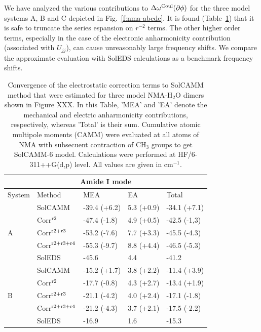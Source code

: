 \documentclass[a4paper,titlepage,twoside,fleqn,12pt]{book}
\begin{document}
\begin{appendices}
We have analyzed the various contributions to $\Delta\omega^{\rm Coul}(\partial\phi)$
for the three model systems A, B and C depicted in Fig.~\ref{f:nma-abcde}. It is found 
(Table~\ref{t:ctest}) that
it is safe to truncate the series espansion on $r^{-2}$ terms. The other higher order terms,
especially in the case of the electronic anharmonicity contribution 
(associated with $U_{jj}$), can cause unreasonably
large frequency shifts. 
We compare the approximate evaluation with SolEDS calculations as a benchmark frequency shifts.

\begin{table}[ht]
\caption{Convergence of the electrostatic correction terms to SolCAMM
method that were estimated for three model NMA-H$_2$O dimers
shown in Figure XXX. In this Table, 'MEA' and 'EA' denote the mechanical and electric
anharmonicity contributions, respectively, whereas 'Total' is their sum.
Cumulative atomic multipole moments (CAMM) were evaluated 
at all atoms of NMA with subsecuent contraction of CH$_3$ groups 
to get SolCAMM-6 model.
Calculations were performed at HF/6-311++G(d,p) level.
All values are given in cm$^{-1}$.
\label{t:ctest}}
\begin{tabular*}{1.0\textwidth}{@{\extracolsep{\fill} } l ll ll}
\hline\hline
\multicolumn{5}{c}{Amide I mode} \\
\hline
System               & Method    & MEA           & EA         & Total        \\
\hline
\multirow{5}{*}{A}   & SolCAMM   & -39.4 (+6.2)  & 5.3 (+0.9) & -34.1 (+7.1) \\
        & Corr$^{\rm r2}$        & -47.4 (-1.8)  & 4.9 (+0.5) & -42.5 (-1,3) \\
        & Corr$^{\rm r2+r3}$     & -53.2 (-7.6)  & 7.7 (+3.3) & -45.5 (-4.3) \\
        & Corr$^{\rm r2+r3+r4}$  & -55.3 (-9.7)  & 8.8 (+4.4) & -46.5 (-5.3) \\
                     & SolEDS    & -45.6         & 4.4        & -41.2        \\
\hline
\multirow{5}{*}{B}   & SolCAMM   & -15.2 (+1.7)  & 3.8 (+2.2) & -11.4 (+3.9) \\
        & Corr$^{\rm r2}$        & -17.7 (-0.8)  & 4.3 (+2.7) & -13.4 (+1.9) \\
        & Corr$^{\rm r2+r3}$     & -21.1 (-4.2)  & 4.0 (+2.4) & -17.1 (-1.8) \\
        & Corr$^{\rm r2+r3+r4}$  & -21.2 (-4.3)  & 3.7 (+2.1) & -17.5 (-2.2) \\
                     & SolEDS    & -16.9         & 1.6        & -15.3        \\

\end{tabular*}
\end{table}
\end{appendices}
\end{document}
